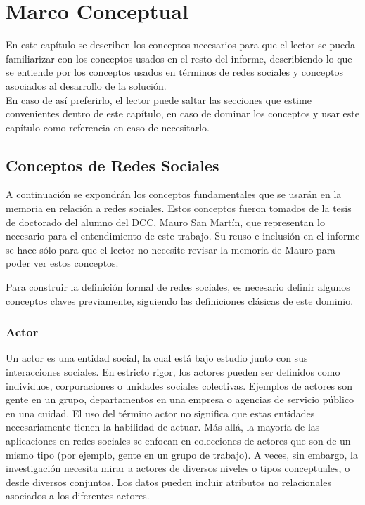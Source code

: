 \chapter{Marco Conceptual}
\label{chap:marco_conceptual}

En este capítulo se describen los conceptos necesarios para que el lector se pueda familiarizar con los conceptos usados en el resto del informe, describiendo lo que se entiende por los conceptos usados en términos de redes sociales y conceptos asociados al desarrollo de la solución.\\

En caso de así preferirlo, el lector puede saltar las secciones que estime convenientes dentro de este capítulo, en caso de dominar los conceptos y usar este capítulo como referencia en caso de necesitarlo.

\section{Conceptos de Redes Sociales} %
\label{sec:conceptos_de_redes_sociales}


A continuación se expondrán los conceptos fundamentales que se usarán en la memoria en relación a redes sociales. Estos conceptos fueron tomados de la tesis de doctorado del alumno del DCC, Mauro San Martín\cite{tesismauro}, que representan lo necesario para el entendimiento de este trabajo. Su reuso e inclusión en el informe se hace sólo para que el lector no necesite revisar la memoria de Mauro para poder ver estos conceptos.

Para construir la definición formal de redes sociales, es necesario definir algunos conceptos claves previamente, siguiendo las definiciones clásicas de este dominio\cite{sna}.

\subsection{Actor} %
\label{sub:actor}
Un actor es una entidad social, la cual está bajo estudio junto con sus interacciones sociales. En estricto rigor, los actores pueden ser definidos como individuos, corporaciones o unidades sociales colectivas. Ejemplos de actores son gente en un grupo, departamentos en una empresa o agencias de servicio público en una cuidad. El uso del término actor no significa que estas entidades necesariamente tienen la habilidad de actuar. Más allá, la mayoría de las aplicaciones en redes sociales se enfocan en colecciones de actores que son de un mismo tipo (por ejemplo, gente en un grupo de trabajo). A veces, sin embargo, la investigación necesita mirar a actores de diversos niveles o tipos conceptuales, o desde diversos conjuntos. Los datos pueden incluir atributos no relacionales asociados a los diferentes actores.

